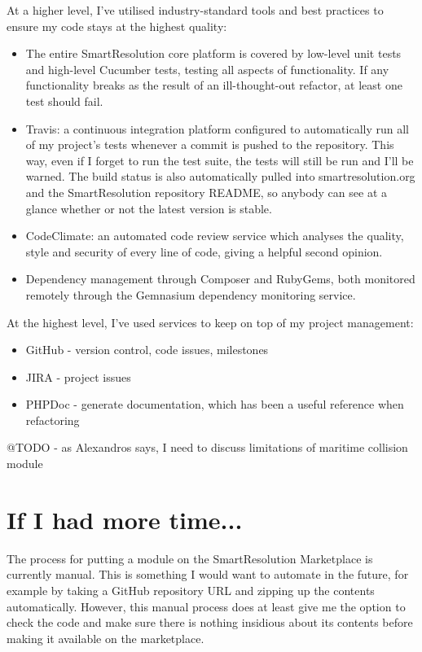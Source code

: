 At a higher level, I've utilised industry-standard tools and best practices to ensure my code stays at the highest quality:

\begin{itemize}
\item The entire SmartResolution core platform is covered by low-level unit tests and high-level Cucumber tests, testing all aspects of functionality. If any functionality breaks as the result of an ill-thought-out refactor, at least one test should fail.
\item Travis: a continuous integration platform configured to automatically run all of my project's tests whenever a commit is pushed to the repository. This way, even if I forget to run the test suite, the tests will still be run and I'll be warned. The build status is also automatically pulled into smartresolution.org and the SmartResolution repository README, so anybody can see at a glance whether or not the latest version is stable.
\item CodeClimate: an automated code review service which analyses the quality, style and security of every line of code, giving a helpful second opinion.
\item Dependency management through Composer and RubyGems, both monitored remotely through the Gemnasium dependency monitoring service.
\end{itemize}

At the highest level, I've used services to keep on top of my project management:

\begin{itemize}
\item GitHub - version control, code issues, milestones
\item JIRA - project issues
\item PHPDoc - generate documentation, which has been a useful reference when refactoring
\end{itemize}

@TODO - as Alexandros says, I need to discuss limitations of maritime collision module

\section{If I had more time...}

The process for putting a module on the SmartResolution Marketplace is currently manual. This is something I would want to automate in the future, for example by taking a GitHub repository URL and zipping up the contents automatically. However, this manual process does at least give me the option to check the code and make sure there is nothing insidious about its contents before making it available on the marketplace.

